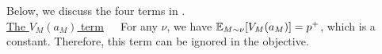 %
%
%
%
Below, we discuss the four terms in . \\

\noindent\underline{The $V_M(a_M)$ term}\ \ \ For any $\nu$, we have $\mathbb{E}_{M\sim \nu}[V_M(a_M)] = p^+$, which is a constant. Therefore, this term can be ignored in the objective. \\


